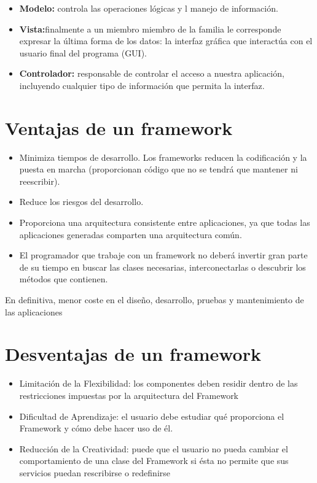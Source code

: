 \begin{itemize}
\item \textbf{Modelo:} controla las operaciones lógicas y l manejo de información.
\item \textbf{Vista:}finalmente a un miembro miembro de la familia le corresponde expresar la última forma de los datos: la interfaz gráfica que interactúa con el usuario final del programa (GUI).
\item \textbf{Controlador:} responsable de controlar el acceso a nuestra aplicación, incluyendo cualquier tipo de información que permita la interfaz.
\end{itemize}

\section{Ventajas de un framework}

\begin{itemize}
\item Minimiza tiempos de desarrollo. Los frameworks reducen la codificación y la puesta en marcha (proporcionan código que no se tendrá que mantener ni reescribir).
\item Reduce los riesgos del desarrollo.
\item Proporciona una arquitectura consistente entre aplicaciones, ya que todas las aplicaciones generadas comparten una arquitectura común. 
\item El programador que trabaje con un framework no deberá invertir gran parte de su tiempo en buscar las clases necesarias, interconectarlas o descubrir los métodos que contienen.
\end{itemize}
En definitiva, menor coste en el diseño, desarrollo, pruebas y mantenimiento de las aplicaciones

\section{Desventajas de un framework}

\begin{itemize}
\item Limitación de la Flexibilidad: los componentes deben residir dentro de las restricciones impuestas por la arquitectura del Framework
\item Dificultad de Aprendizaje: el usuario debe estudiar qué proporciona el Framework y cómo debe hacer uso de él.
\item Reducción de la Creatividad: puede que el usuario no pueda cambiar el comportamiento de una clase del Framework si ésta no permite que sus servicios puedan rescribirse o redefinirse
\end{itemize}
